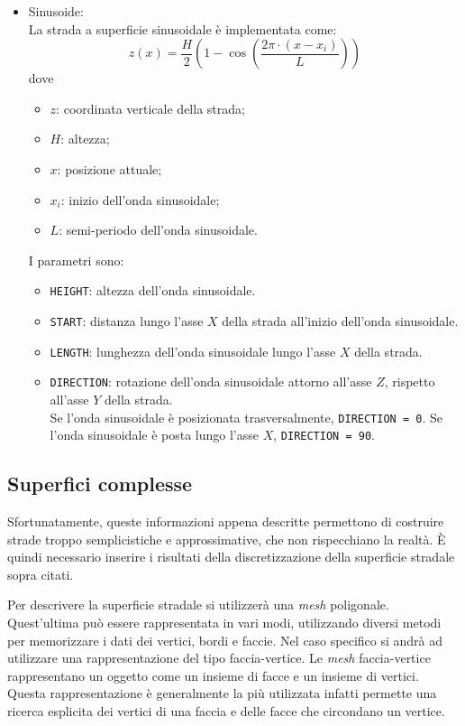\begin{itemize}
\begin{pseudoc}
	{ X_road	Z_left	Z_right }
	(XZ_DATA)
	-1.0e04	0	0
	0.0500	0	0
	0.1000	0	0
	0.1500	0	0
	... ... ...
	\end{pseudoc}
	\item Sinusoide:\\
	La strada a superficie sinusoidale è implementata come:
	\begin{equation}
	z(x)=\frac{H}{2}\left( 1 - \cos \left( \frac{2\pi \cdot (x-x_i)}{L} \right)   \right) 
	\end{equation}
	dove	
	\begin{itemize}
	 	\item $z$: coordinata verticale della strada;
	 	\item $H$: altezza;
	 	\item $x$: posizione attuale;
	 	\item $x_i$: inizio dell'onda sinusoidale;
	 	\item $L$: semi-periodo dell'onda sinusoidale.
	\end{itemize}
	I parametri sono:	
	\begin{itemize}
		\item \texttt{HEIGHT}: altezza dell'onda sinusoidale.
		\item \texttt{START}: distanza lungo l'asse $X$ della strada all'inizio dell'onda sinusoidale.
		\item \texttt{LENGTH}: lunghezza dell'onda sinusoidale lungo l'asse $X$ della strada.
		\item \texttt{DIRECTION}: rotazione dell'onda sinusoidale attorno all'asse $Z$, rispetto all'asse $Y$ della strada.\\
		Se l'onda sinusoidale è posizionata trasversalmente, \texttt{DIRECTION = 0}. Se l'onda sinusoidale è posta lungo l'asse $X$, \texttt{DIRECTION = 90}.
	\end{itemize}
\end{itemize}
%
%
\subsection{Superfici complesse}
Sfortunatamente, queste informazioni appena descritte permettono di costruire strade troppo semplicistiche e approssimative, che non rispecchiano la realtà. È quindi necessario inserire i risultati della discretizzazione della superficie stradale sopra citati.

Per descrivere la superficie stradale si utilizzerà una \textit{mesh} poligonale. Quest'ultima può essere rappresentata in vari modi, utilizzando diversi metodi per memorizzare i dati dei vertici, bordi e faccie. Nel caso specifico si andrà ad utilizzare una rappresentazione del tipo faccia-vertice. Le \textit{mesh} faccia-vertice rappresentano un oggetto come un insieme di facce e un insieme di vertici. Questa rappresentazione è generalmente la più utilizzata infatti permette una ricerca esplicita dei vertici di una faccia e delle facce che circondano un vertice.

